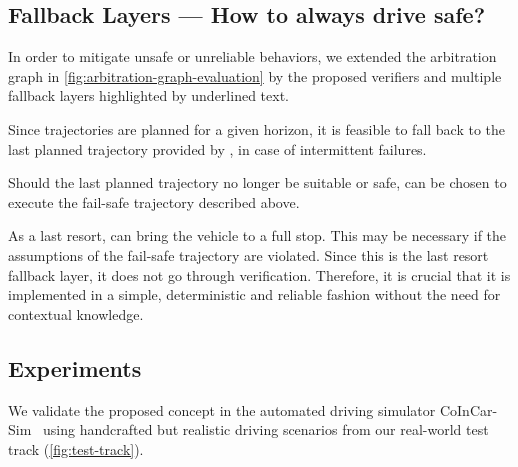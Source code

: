 


\subsection{Fallback Layers --- How to always \textbf{drive safe}?}

In order to mitigate unsafe or unreliable behaviors,
we extended the arbitration graph in \cref{fig:arbitration-graph-evaluation}
by the proposed verifiers and multiple fallback layers
highlighted by underlined text.

Since trajectories are planned for a given horizon,
it is feasible to fall back to the last planned trajectory
provided by ,
in case of intermittent failures.

Should the last planned trajectory no longer be suitable or safe,
 can be chosen to execute the fail-safe trajectory described above.

As a last resort,  can bring the vehicle to a full stop.
This may be necessary if the assumptions of the fail-safe trajectory are violated.
%
Since this is the last resort fallback layer,
it does not go through verification.
Therefore, it is crucial that it is implemented in a simple, deterministic and reliable fashion
without the need for contextual knowledge.




\subsection{Experiments}

We validate the proposed concept in the automated driving simulator CoInCar-Sim~\cite{naumannCoInCarSimOpenSourceSimulation2018}
using handcrafted but realistic driving scenarios
from our real-world test track%
(\cref{fig:test-track}).

